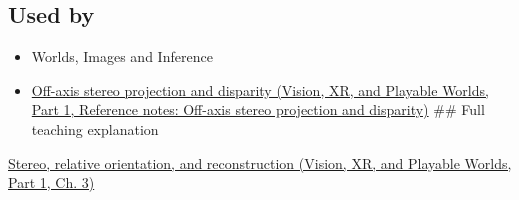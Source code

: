 \subsection{Used by}\label{appendix-c4e98b6e4001-used-by}

\hypertarget{appendix-c4e98b6e4001-used-by}{}

\begin{itemize}
\item
  {Worlds, Images and Inference}
\item
  \href{../07-Vision-XR-and-Playable-Worlds-P01/main.pdf\#nameddest=appendix-0976e86e5b9f}{Off-axis stereo projection and disparity (Vision, XR, and Playable Worlds, Part 1, Reference notes: Off-axis stereo projection and disparity)} \#\# Full teaching explanation
\end{itemize}

\href{../07-Vision-XR-and-Playable-Worlds-P01/main.pdf\#nameddest=04-visual-computing-ii-ch032-stereo-relative-orientation-and-reconstruction}{Stereo, relative orientation, and reconstruction (Vision, XR, and Playable Worlds, Part 1, Ch. 3)}
